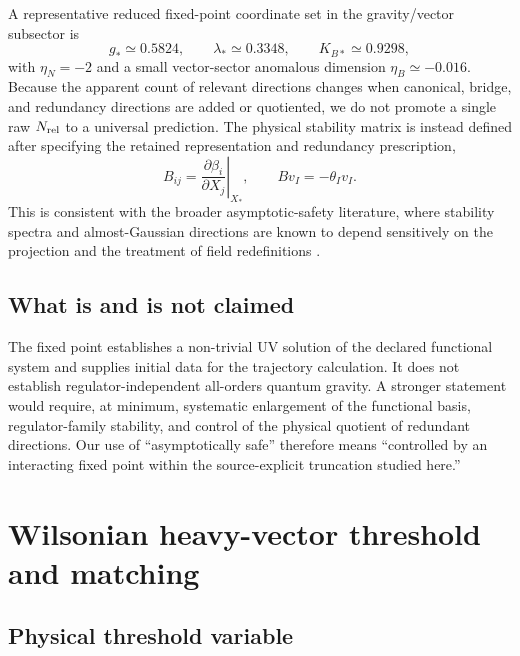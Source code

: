 \documentclass[12pt]{iopart}
\begin{document}
A representative reduced fixed-point coordinate set in the gravity/vector subsector is
\begin{equation}
 g_*\simeq0.5824,\qquad
 \lambda_*\simeq0.3348,\qquad
 K_{B*}\simeq0.9298,
\end{equation}
with $\eta_N=-2$ and a small vector-sector anomalous dimension $\eta_B\simeq-0.016$.  Because the apparent count of relevant directions changes when canonical, bridge, and redundancy directions are added or quotiented, we do not promote a single raw $N_{\rm rel}$ to a universal prediction.  The physical stability matrix is instead defined after specifying the retained representation and redundancy prescription,
\begin{equation}
B_{ij}=\left.\frac{\partial\beta_i}{\partial X_j}\right|_{X_*},\qquad
Bv_I=-\theta_Iv_I.
\label{eq:stability}
\end{equation}
This is consistent with the broader asymptotic-safety literature, where stability spectra and almost-Gaussian directions are known to depend sensitively on the projection and the treatment of field redefinitions \cite{Knorr2023,BeckerKurovSaueressig2024,SaueressigSilva2024}.

\subsection{What is and is not claimed}

The fixed point establishes a non-trivial UV solution of the declared functional system and supplies initial data for the trajectory calculation.  It does not establish regulator-independent all-orders quantum gravity.  A stronger statement would require, at minimum, systematic enlargement of the functional basis, regulator-family stability, and control of the physical quotient of redundant directions.  Our use of ``asymptotically safe'' therefore means ``controlled by an interacting fixed point within the source-explicit truncation studied here.''

\section{Wilsonian heavy-vector threshold and matching}
\label{sec:wilson}

\subsection{Physical threshold variable}
\end{document}
